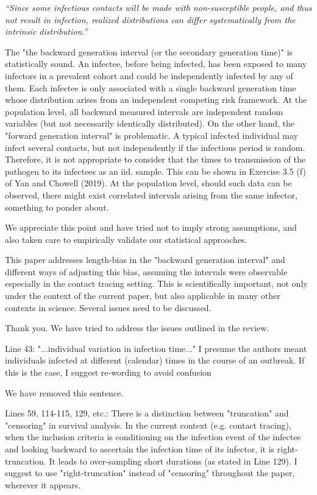 \documentclass[12pt]{article}
\newcommand{\revtext}{\textsf}
\newcommand{\newtext}[1]{\textsl{``#1''}}
\begin{document}
\newtext{Since some infectious contacts will be made with non-susceptible people, and thus not result in infection, realized distributions can differ systematically from the intrinsic distribution.}

\revtext{
The "the backward generation interval (or the secondary generation time)" is statistically sound. An infectee, before being infected, has been exposed to many infectors in a prevalent cohort and
could be independently infected by any of them. Each infectee is only associated with a single backward generation time whose distribution arises
from an independent competing risk framework. At the population level,
all backward measured intervals are independent random variables (but
not necessarily identically distributed). On the other hand, the "forward
generation interval" is problematic. A typical infected individual may
infect several contacts, but not independently if the infectious period is
random. Therefore, it is not appropriate to consider that the times to
transmission of the pathogen to its infectees as an iid. sample. This can
be shown in Exercise 3.5 (f) of Yan and Chowell (2019). At the population level, should such data can be observed, there might exist correlated
intervals arising from the same infector, something to ponder about.
}

We appreciate this point and have tried not to imply strong assumptions, and also taken care to empirically validate our statistical approaches.

\revtext{This paper addresses length-bias in the "backward generation interval" and
different ways of adjusting this bias, assuming the intervals were observable
especially in the contact tracing setting. This is scientifically important, not
only under the context of the current paper, but also applicable in many other
contexts in science. Several issues need to be discussed.}

Thank you. We have tried to address the issues outlined in the review.

\revtext{
Line 43: "...individual variation in infection time..." I presume the authors
meant individuals infected at different (calendar) times in the course of
an outbreak. If this is the case, I suggest re-wording to avoid confusion
}

We have removed this sentence.

\revtext{
Lines 59, 114-115, 129, etc.: There is a distinction between "truncation"
and "censoring" in survival analysis. In the current context (e.g. contact tracing), when the inclusion criteria is conditioning on the infection
event of the infectee and looking backward to ascertain the infection time
of its infector, it is right-truncation. It leads to over-sampling short durations (as stated in Line 129). I suggest to use "right-truncation" instead
of "censoring" throughout the paper, wherever it appears.
}
\end{document}
